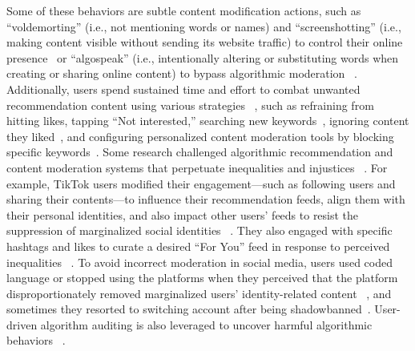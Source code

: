 Some of these behaviors are subtle content modification actions, such as ``voldemorting'' (i.e., not mentioning words or names) and ``screenshotting'' (i.e., making content visible without sending its website traffic) to control their online presence~\cite{van2018networks} or ``algospeak'' (i.e., intentionally altering or substituting words when creating or sharing online content) to bypass algorithmic moderation ~\cite{klug2023how}. Additionally, users spend sustained time and effort to combat unwanted recommendation content using various strategies ~\cite{papadamou2022just, ricks2022does}, such as refraining from hitting likes, tapping ``Not interested,'' searching new keywords~\cite{kim2023investigating}, ignoring content they liked~\cite{Cen_Ilyas_Allen_Li_Madry_2024}, and configuring personalized content moderation tools by blocking specific keywords~\cite{jhaver2022designing}. Some research challenged algorithmic recommendation and content moderation systems that perpetuate inequalities and injustices ~\cite{karizat2021algorithmic,bishop2018anxiety,rosenblat2016algorithmic,kasy2021fairness}. For example, TikTok users modified their engagement---such as following users and sharing their contents---to influence their recommendation feeds, align them with their personal identities, and also impact other users’ feeds to resist the suppression of marginalized social identities ~\cite{karizat2021algorithmic}. They also engaged with specific hashtags and likes to curate a desired ``For You'' feed in response to perceived inequalities ~\cite{simpson2021}. To avoid incorrect moderation in social media, users used coded language or stopped using the platforms when they perceived that the platform disproportionately removed
marginalized users’ identity-related content ~\cite{mayworm2024content}, and sometimes they resorted to switching account after being shadowbanned~\cite{yao2024blind}. User-driven algorithm auditing is also leveraged to uncover harmful algorithmic behaviors ~\cite{devos2022toward, shen2021everyday}. 

